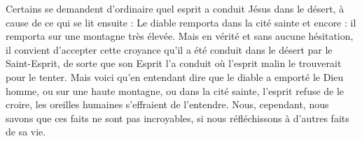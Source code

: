 Certains se demandent d’ordinaire quel esprit a conduit Jésus dans le désert, à cause de ce qui se lit ensuite : Le diable remporta dans la cité sainte et encore : il remporta sur une montagne très élevée. Mais en vérité et sans aucune hésitation, il convient d’accepter cette croyance qu’il a été conduit dans le désert par le Saint-Esprit, de sorte que son Esprit l’a conduit où l’esprit malin le trouverait pour le tenter. Mais voici qu’en entendant dire que le diable a emporté le Dieu homme, ou sur une haute montagne, ou dans la cité sainte, l’esprit refuse de le croire, les oreilles humaines s’effraient de l’entendre. Nous, cependant, nous savons que ces faits ne sont pas incroyables, si nous réfléchissons à d’autres faits de sa vie.
